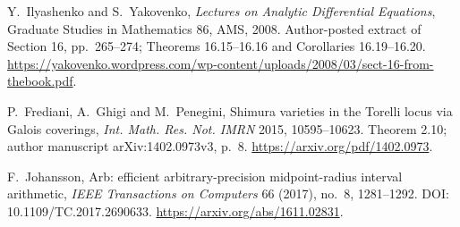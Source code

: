 Y.~Ilyashenko and S.~Yakovenko,
\emph{Lectures on Analytic Differential Equations},
Graduate Studies in Mathematics 86, AMS, 2008.
Author-posted extract of Section 16, pp.~265--274;
Theorems 16.15--16.16 and Corollaries 16.19--16.20.
\url{https://yakovenko.wordpress.com/wp-content/uploads/2008/03/sect-16-from-thebook.pdf}.

P.~Frediani, A.~Ghigi and M.~Penegini,
Shimura varieties in the Torelli locus via Galois coverings,
\emph{Int. Math. Res. Not. IMRN} 2015, 10595--10623.
Theorem 2.10; author manuscript arXiv:1402.0973v3, p.~8.
\url{https://arxiv.org/pdf/1402.0973}.

F.~Johansson,
Arb: efficient arbitrary-precision midpoint-radius interval arithmetic,
\emph{IEEE Transactions on Computers} 66 (2017), no.~8, 1281--1292.
DOI: 10.1109/TC.2017.2690633.
\url{https://arxiv.org/abs/1611.02831}.
